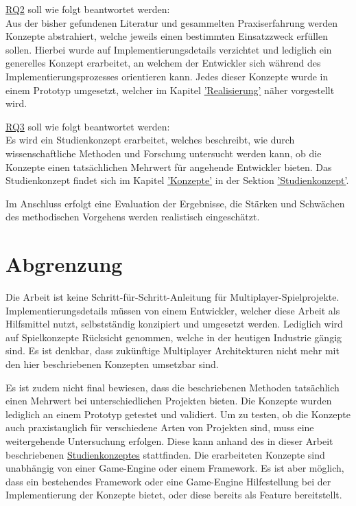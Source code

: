 \hyperref[RQ2]{RQ2} soll wie folgt beantwortet werden: \\
Aus der bisher gefundenen Literatur und gesammelten Praxiserfahrung werden Konzepte abstrahiert, welche jeweils einen bestimmten Einsatzzweck erfüllen sollen. Hierbei wurde auf Implementierungsdetails verzichtet und lediglich ein generelles Konzept erarbeitet, an welchem der Entwickler sich während des Implementierungsprozesses orientieren kann. Jedes dieser Konzepte wurde in einem Prototyp umgesetzt, welcher im Kapitel \hyperref[sec:realisierung]{'Realisierung'} näher vorgestellt wird.

\hyperref[RQ3]{RQ3} soll wie folgt beantwortet werden: \\
Es wird ein Studienkonzept erarbeitet, welches beschreibt, wie durch wissenschaftliche Methoden und Forschung untersucht werden kann, ob die Konzepte einen tatsächlichen Mehrwert für angehende Entwickler bieten. Das Studienkonzept findet sich im Kapitel \hyperref[sec:konzepte]{'Konzepte'} in der Sektion \hyperref[studienkonzept]{'Studienkonzept'}.

Im Anschluss erfolgt eine Evaluation der Ergebnisse, die Stärken und Schwächen des methodischen Vorgehens werden realistisch eingeschätzt.

\section{Abgrenzung}

Die Arbeit ist keine Schritt-für-Schritt-Anleitung für Multiplayer-Spielprojekte. Implementierungsdetails müssen von einem Entwickler, welcher diese Arbeit als Hilfsmittel nutzt, selbstständig konzipiert und umgesetzt werden. Lediglich wird auf Spielkonzepte Rücksicht genommen, welche in der heutigen Industrie gängig sind. Es ist denkbar, dass zukünftige Multiplayer Architekturen nicht mehr mit den hier beschriebenen Konzepten umsetzbar sind.

Es ist zudem nicht final bewiesen, dass die beschriebenen Methoden tatsächlich einen Mehrwert bei unterschiedlichen Projekten bieten. Die Konzepte wurden lediglich an einem Prototyp getestet und validiert. Um zu testen, ob die Konzepte auch praxistauglich für verschiedene Arten von Projekten sind, muss eine weitergehende Untersuchung erfolgen. Diese kann anhand des in dieser Arbeit beschriebenen \hyperref[studienkonzept]{Studienkonzeptes} stattfinden. Die erarbeiteten Konzepte sind unabhängig von einer Game-Engine oder einem Framework. Es ist aber möglich, dass ein bestehendes Framework oder eine Game-Engine Hilfestellung bei der Implementierung der Konzepte bietet, oder diese bereits als Feature bereitstellt.

